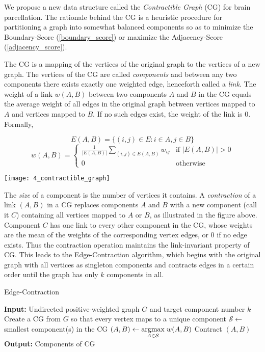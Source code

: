 We propose a new data structure called the \textit{Contractible Graph}
(CG) for brain parcellation. The rationale behind the CG is a heuristic
procedure for partitioning a graph into somewhat balanced components
so as to minimize the Boundary-Score (\ref{boundary_score}) or maximize
the Adjacency-Score (\ref{adjacency_score}).

The CG is a mapping of the vertices of the original graph to the
vertices of a new graph. The vertices of the CG are called
\textit{components} and between any two components there exists exactly
one weighted edge, henceforth called a \textit{link}. The weight
of a link $w(A,B)$ between two components $A$ and $B$ in the CG equals
the average weight of all edges in the original graph between vertices
mapped to $A$ and vertices mapped to $B$. If no such edges exist,
the weight of the link is $0$. Formally,

\[ E(A,B) = \{(i, j) \in E : i \in A, j \in B\} \]
\[ w(A,B) = \begin{cases}
    \frac{1}{|E(A,B)|} \sum_{(i,j) \in E(A,B)} w_{ij} &
        \text{if } |E(A,B)| > 0 \\
    0 & \text{otherwise}
\end{cases} \]

\texttt{[image: 4\_contractible\_graph]}

The \textit{size} of a component is the number of vertices it contains.
A \textit{contraction} of a link $(A,B)$ in a CG replaces components
$A$ and $B$ with a new component (call it $C$) containing all vertices
mapped to $A$ or $B$, as illustrated in the figure above.
Component $C$ has one link to every other component in the CG, whose
weights are the mean of the weights of the corresponding vertex edges,
or $0$ if no edge exists. Thus the contraction operation maintains the
link-invariant property of CG. This leads to the Edge-Contraction
algorithm, which begins with the original graph with all vertices as
singleton components and contracts edges in a certain order until the
graph has only $k$ components in all.

\begin{algorithm}
\caption{Edge-Contraction}
\begin{algorithmic}
\State \textbf{Input:} Undirected positive-weighted graph $G$ and
       target component number $k$
\State Create a CG from $G$ so that every vertex maps to
       a unique component
\Repeat
\State $\mathcal{S} \gets$ smallest component(s) in the CG
\State $(A,B) \gets \underset{A \in \mathcal{S}}{\mathrm{arg max}}\; w(A,B)$
\State Contract $(A,B)$
\State \textbf{Output:} Components of CG
\end{algorithmic}
\end{algorithm}

